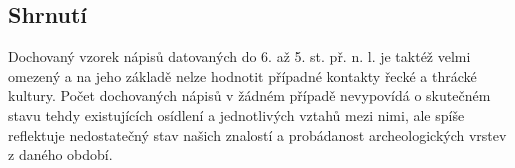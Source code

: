 
\subsection[shrnutí-4]{Shrnutí}

Dochovaný vzorek nápisů datovaných do 6. až 5. st. př. n. l. je taktéž velmi omezený a na jeho základě nelze hodnotit případné kontakty řecké a thrácké kultury. Počet dochovaných nápisů v žádném případě nevypovídá o skutečném stavu tehdy existujících osídlení a jednotlivých vztahů mezi nimi, ale spíše reflektuje nedostatečný stav našich znalostí a probádanost archeologických vrstev z daného období.


